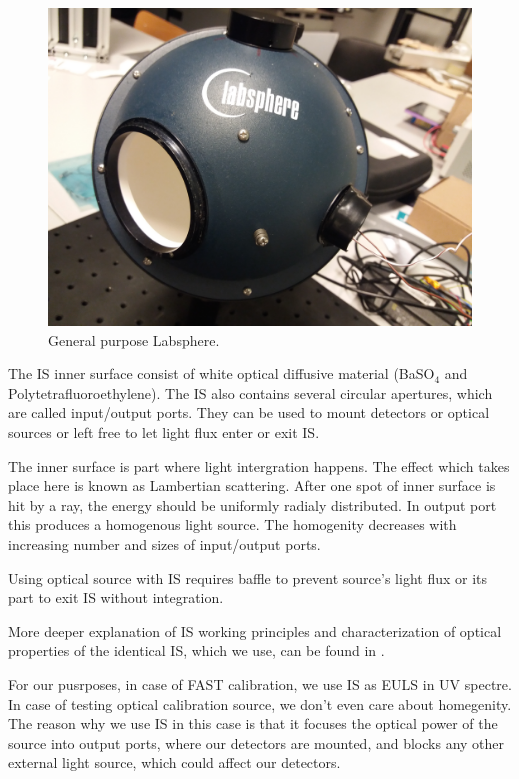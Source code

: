 \begin{figure}[H]
 \centering
 \includegraphics[scale=0.09, angle = 180]{./pictures/IntegrationSphere}
 \caption{General purpose Labsphere.}
 \label{Labsphere}
 
\end{figure}
\par
The IS inner surface consist of white optical diffusive material (BaSO$_4$ and Polytetrafluoroethylene). The IS also contains several circular apertures, which are called input/output ports. They can be used to mount detectors or optical sources or left free to let light flux enter or exit IS. 
\par
The inner surface is part where light intergration happens. The effect which takes place here is known as Lambertian scattering. After one spot of inner surface is hit by a ray, the energy should be uniformly radialy distributed. In output port this produces a homogenous light source. The homogenity decreases with increasing number and sizes of input/output ports.
\par
Using optical source with IS requires baffle to prevent source's light flux or its part to exit IS without integration.
\par
More deeper explanation of IS working principles and characterization of optical properties of the identical IS, which we use, can be found in \cite{VACULA2021167169}.
\par
For our pusrposes, in case of FAST calibration, we use IS as EULS in UV spectre. In case of testing optical calibration source, we don't even care about homegenity. The reason why we use IS in this case is that it focuses the optical power of the source into output ports, where  our detectors are mounted, and blocks any other external light source, which could affect our detectors.

